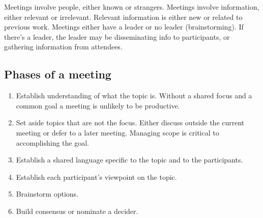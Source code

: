 Meetings involve people, either known or strangers.
Meetings involve information, either relevant or irrelevant. Relevant information is either new or related to previous work.
Meetings either have a leader or no leader (brainstorming). If there's a leader, the leader may be disseminating info to participants, or gathering information from attendees.


\subsection*{Phases of a meeting}

\begin{enumerate}
    \item Establish understanding of what the topic is. Without a shared focus and a common goal a meeting is unlikely to be productive. 
    \item Set aside topics that are not the focus. Either discuss outside the current meeting or defer to a later meeting. Managing scope is critical to accomplishing the goal. 
    \item Establish a shared language specific to the topic and to the participants.
    \item Establish each participant's viewpoint on the topic.
    \item Brainstorm options.
    \item Build consensus or nominate a decider.
\end{enumerate}